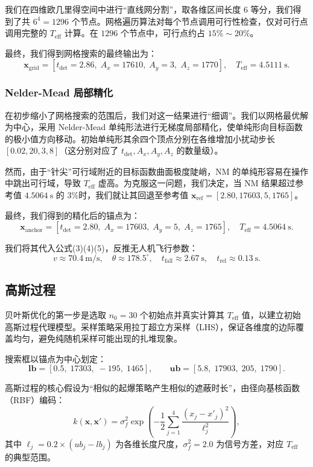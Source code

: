 \documentclass{ctexart}
\begin{document}
我们在四维欧几里得空间中进行“直线网分割”，取各维区间长度 $6$ 等分，我们得到了共 $6^4=1296$ 个节点。网格遍历算法对每个节点调用可行性检查，仅对可行点调用完整的 $T_{\text{eff}}$ 计算。在 $1296$ 个节点中，可行点约占 $15\%\sim20\%$。

最终，我们得到网格搜索的最终输出为：
\[
\mathbf{x}_{\text{grid}} = [t_{\text{det}} = 2.86,\; A_x = 17610,\; A_y = 3,\; A_z = 1770], \quad T_{\text{eff}} = 4.5111\ \mathrm{s}.
\]

\subsubsection{Nelder-Mead 局部精化}
在初步缩小了网格搜索的范围后，我们对这一结果进行“细调”。我们以网格最优解为中心，采用 Nelder-Mead 单纯形法进行无梯度局部精化，使单纯形向目标函数的极小值方向移动。初始单纯形其余四个顶点分别在各维增加小扰动步长 $[0.02, 20, 3, 8]$（这分别对应了 $t_{\text{det}}, A_x, A_y, A_z$ 的数量级）。

然而，由于“针尖”可行域附近的目标函数曲面极度陡峭，NM 的单纯形容易在操作中跳出可行域，导致 $T_{\text{eff}}$ 虚高。为克服这一问题，我们决定，当 NM 结果超过参考值 $4.5064\ \mathrm{s}$ 的 $3\%$时，我们就让其回退至参考值 $\mathbf{x}_{\text{ref}} = [2.80, 17603, 5, 1765]$。

最终，我们得到的精化后的锚点为：
\[
\mathbf{x}_{\text{anchor}} = [t_{\text{det}} = 2.80,\; A_x = 17603,\; A_y = 5,\; A_z = 1765], \quad T_{\text{eff}} = 4.5064\ \mathrm{s}.
\]

我们将其代入公式(3)(4)(5)，反推无人机飞行参数：
\[
v \approx 70.4\ \mathrm{m/s},\quad \theta \approx 178.5^\circ,\quad t_{\text{fall}} \approx 2.67\ \mathrm{s},\quad t_{\text{rel}} \approx 0.13\ \mathrm{s}.
\]


\subsection{高斯过程}
贝叶斯优化的第一步是选取 $n_0=30$ 个初始点并真实计算其 $T_{\text{eff}}$ 值，以建立初始高斯过程代理模型。采样策略采用拉丁超立方采样（LHS），保证各维度的边际覆盖均匀，避免纯随机采样可能出现的扎堆现象。

搜索框以锚点为中心划定：
\[
\mathbf{lb} = [0.5,\; 17303,\; -195,\; 1465], \qquad
\mathbf{ub} = [5.8,\; 17903,\; 205,\; 1790].
\]

高斯过程的核心假设为“相似的起爆策略产生相似的遮蔽时长”，由径向基核函数（RBF）编码：
\[
k(\mathbf{x}, \mathbf{x}') = \sigma_f^2 \exp\!\left(-\frac{1}{2}\sum_{j=1}^{4} \frac{(x_j - x'_j)^2}{\ell_j^2}\right), \label{eq:rbf}
\]
其中 $\ell_j = 0.2 \times (ub_j - lb_j)$ 为各维长度尺度，$\sigma_f^2 = 2.0$ 为信号方差，对应 $T_{\text{eff}}$ 的典型范围。
\end{document}
